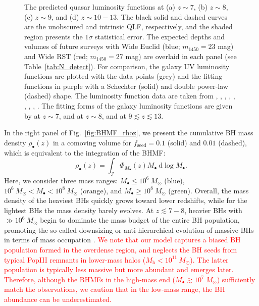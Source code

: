 \documentclass[twocolumn, twocolappendix]{aastex63}
\newcommand{\Msun}{M_\odot}
\newcommand{\Mh}{M_\mathrm{h}}
\newcommand{\Mbh}{M_\bullet}
\newcommand{\fseed}{f_\mathrm{seed}}
\newcommand{\D}{\mathrm{d}}
\newcommand{\red}[1]{\textcolor{red}{ #1}}
\begin{document}
\begin{CJK*}{UTF8}{gbsn}
\begin{figure}
\caption{
The predicted quasar luminosity functions at (a) $z\sim 7$, (b) $z\sim 8$, (c) $z\sim 9$, and (d) $z\sim 10-13$.
The black solid and dashed curves are the unobscured and intrinsic QLF, respectively, and the shaded region presents the $1\sigma$ statistical error.
The expected depths and volumes of future surveys with Wide Euclid (blue; $m_{1450}= 23$ mag) and Wide RST (red; $m_{1450}= 27$ mag) are overlaid in each panel (see Table~\ref{tab:N_detect}).
For comparison, the galaxy UV luminosity functions are plotted with the data points (grey) and the fitting functions in purple with a Schechter (solid) and double power-law (dashed) shape.
The luminosity function data are taken from \citet{2013MNRAS.432.2696M}, \citet{2016ApJ...819..129O}, \citet{2018ApJ...867..150M},
\citet{2019ApJ...883...99S}, \citet{2020MNRAS.493.2059B}, \citet{2021AJ....162...47B},
\citet{2022ApJS..259...20H,Harikane_2022b,Harikane_2022c}, \citet{2022arXiv220712356D}, \citet{2022arXiv220709434N}.
The fitting forms of the galaxy luminosity functions are given by \citet{2022ApJS..259...20H} at $z\sim 7$, 
\citet{2020MNRAS.493.2059B} and \citet{2013MNRAS.432.2696M} at $z\sim 8$, and \citet{Harikane_2022c} at $9\lesssim z\lesssim 13$.}
\label{fig:LFs}
\vspace{5mm}
\end{figure}



In the right panel of Fig.~\ref{fig:BHMF_rhoz}, we present the cumulative BH mass density $\rho_\bullet(z)$ in a comoving volume
for $\fseed=0.1$ (solid) and $0.01$ (dashed),
which is equivalent to the integration of the BHMF:
%
\begin{equation}
 \rho_\bullet(z)=\int_{\mathcal{I}} \Phi_{\Mbh} (z) \Mbh ~\D \log \Mbh.
\end{equation}
%
Here, we consider three mass ranges: $M_\bullet \leq 10^6~\Msun$ (blue), $10^6~\Msun < M_\bullet < 10^8~\Msun$ (orange),
and $M_\bullet \geq 10^8~\Msun$ (green).
Overall, the mass density of the heaviest BHs quickly grows toward lower redshifts,
while for the lightest BHs the mass density barely evolves.
At $z\lesssim 7-8$, heavier BHs with $\gg 10^6~\Msun$ begin to dominate the mass budget of the entire BH population,
promoting the so-called downsizing or anti-hierarchical evolution of massive BHs 
in terms of mass occupation \citep[e.g.,][]{2014ApJ...786..104U}.
\red{
We note that our model captures a biased BH population formed in the overdense region,
and neglects the BH seeds from typical PopIII remnants in lower-mass halos ($\Mh<10^{11}~\Msun$).
The latter population is typically less massive but more abundant and emerges later.
Therefore, although the BHMFs in the high-mass end ($M_\bullet \gtrsim 10^7~\Msun$) sufficiently match the observations,
we caution that in the low-mass range, the BH abundance can be underestimated.
}




\end{CJK*}
\end{document}
